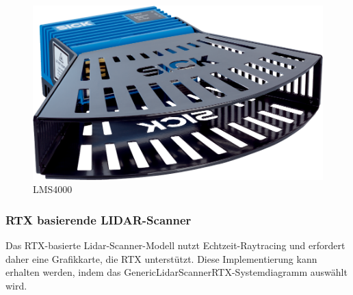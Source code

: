\begin{figure}[htp]
    \centering
    \includegraphics[width=(\textwidth/3)]{images/LMS4000.png}
    \caption{LMS4000}
    \label{fig:LMS4000}
\end{figure}
\subsubsection*{RTX basierende LIDAR-Scanner}
Das RTX-basierte Lidar-Scanner-Modell nutzt Echtzeit-Raytracing und erfordert daher eine Grafikkarte, die RTX unterstützt. Diese Implementierung kann erhalten werden, indem das GenericLidarScannerRTX-Systemdiagramm auswählt wird.\\





